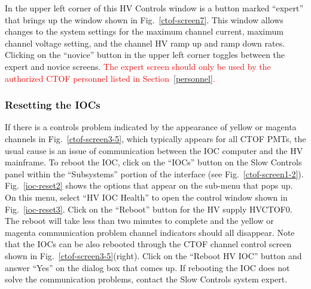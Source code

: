 \documentclass[12pt]{article}
\begin{document}
In the upper left corner of this HV Controls window is a button marked ``expert'' 
that brings up the window shown in Fig.~\ref{ctof-screen7}. This window allows 
changes to the system settings for the maximum channel current, maximum channel 
voltage setting, and the channel HV ramp up and ramp down rates. Clicking on the 
``novice'' button in the upper left corner toggles between the expert and novice 
screens. \textcolor{red}{The expert screen should only be used by the authorized 
CTOF personnel listed in Section~\ref{personnel}.} 

\vfil
\eject

\subsubsection{Resetting the IOCs}
\label{reset-iocs}

If there is a controls problem indicated by the appearance of yellow or magenta 
channels in Fig.~\ref{ctof-screen3-5}, which typically appears for all CTOF PMTs, 
the usual cause is an issue of communication between the IOC computer and the HV 
mainframe. To reboot the IOC, click on the ``IOCs'' button on the Slow Controls 
panel within the ``Subsystems'' portion of the interface (see 
Fig.~\ref{ctof-screen1-2}). Fig.~\ref{ioc-reset2} shows the options that appear 
on the sub-menu that pops up. On this menu, select ``HV IOC Health'' to open the 
control window shown in Fig.~\ref{ioc-reset3}. Click on the ``Reboot'' button for 
the HV supply HVCTOF0. The reboot will take less than two minutes to complete and 
the yellow or magenta communication problem channel indicators should all disappear. 
Note that the IOCs can be also rebooted through the CTOF channel control screen 
shown in Fig.~\ref{ctof-screen3-5}(right). Click on the ``Reboot HV IOC'' button 
and answer ``Yes'' on the dialog box that comes up. If rebooting the IOC does not 
solve the communication problems, contact the Slow Controls system expert.
\end{document}
